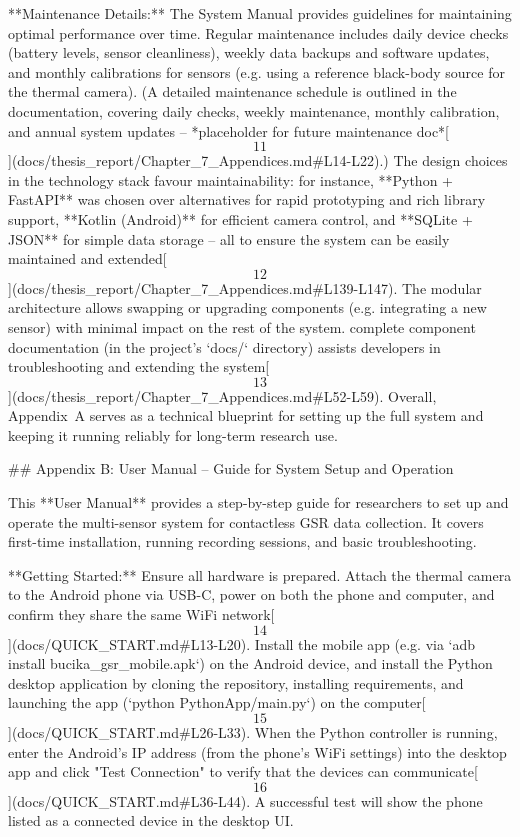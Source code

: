 \documentclass[12pt,a4paper]{article}
\begin{document}
{**Maintenance Details:** The System Manual provides guidelines for
maintaining optimal performance over time. Regular maintenance includes
daily device checks (battery levels, sensor cleanliness), weekly data
backups and software updates, and monthly calibrations for sensors (e.g.
using a reference black-body source for the thermal camera). (A detailed
maintenance schedule is outlined in the documentation, covering daily
checks, weekly maintenance, monthly calibration, and annual system
updates -- *placeholder for future maintenance
doc*[\[11\]](docs/thesis_report/Chapter_7_Appendices.md#L14-L22).)
The design choices in the technology stack favour maintainability: for
instance, **Python + FastAPI** was chosen over alternatives for rapid
prototyping and rich library support, **Kotlin (Android)** for efficient
camera control, and **SQLite + JSON** for simple data storage -- all to
ensure the system can be easily maintained and
extended[\[12\]](docs/thesis_report/Chapter_7_Appendices.md#L139-L147).
The modular architecture allows swapping or upgrading components (e.g.
integrating a new sensor) with minimal impact on the rest of the system.
complete component documentation (in the project's `docs/`
directory) assists developers in troubleshooting and extending the
system[\[13\]](docs/thesis_report/Chapter_7_Appendices.md#L52-L59).
Overall, Appendix A serves as a technical blueprint for setting up the
full system and keeping it running reliably for long-term research use.

## Appendix B: User Manual -- Guide for System Setup and Operation

This **User Manual** provides a step-by-step guide for researchers to
set up and operate the multi-sensor system for contactless GSR data
collection. It covers first-time installation, running recording
sessions, and basic troubleshooting.

**Getting Started:** Ensure all hardware is prepared. Attach the thermal
camera to the Android phone via USB-C, power on both the phone and
computer, and confirm they share the same WiFi
network[\[14\]](docs/QUICK_START.md#L13-L20).
Install the mobile app (e.g. via `adb install bucika_gsr_mobile.apk`) on
the Android device, and install the Python desktop application by
cloning the repository, installing requirements, and launching the app
(`python PythonApp/main.py`) on the
computer[\[15\]](docs/QUICK_START.md#L26-L33).
When the Python controller is running, enter the Android's IP address
(from the phone's WiFi settings) into the desktop app and click "Test
Connection" to verify that the devices can
communicate[\[16\]](docs/QUICK_START.md#L36-L44).
A successful test will show the phone listed as a connected device in
the desktop UI.

}
\end{document}
